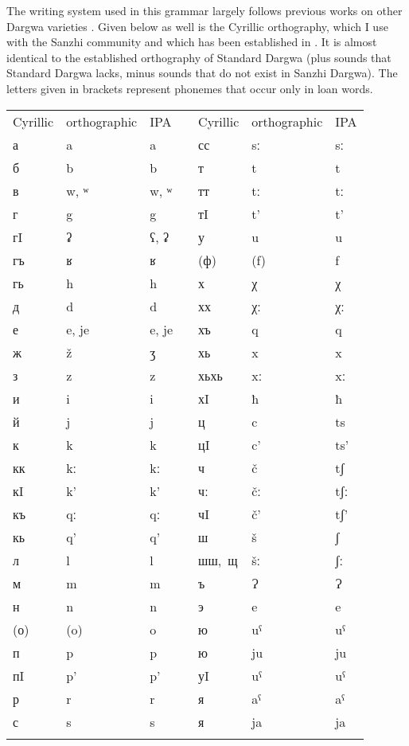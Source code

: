 \label{Orthographic conventions}

The writing system used in this grammar largely follows previous works on other Dargwa varieties \citep{Sumbatova.Mutalov2003, Sumbatova.Lander2014}. Given below as well is the Cyrillic orthography, which I use with the Sanzhi community and which has been established in \citet{Forker.Gadzhimuradov2017}. It is almost identical to the established orthography of Standard Dargwa (plus sounds that Standard Dargwa lacks, minus sounds that do not exist in Sanzhi Dargwa). The letters given in brackets represent phonemes that occur only in loan words.
%
\largerpage[2]
\begin{table}[h!]
	\centering
	\small
	\begin{tabularx}{0.8\textwidth}[]{lllXlll}
	\lsptoprule
			Cyrillic &	orthographic &	IPA	&	{}	&	Cyrillic &	orthographic &	IPA\\
		\cmidrule{1-3} \cmidrule{5-7}
			а	&	a	&	a	&	{}	&	сс	&	sː	&	sː\\
			б	&	b	&	b	&	{}	&	т	&	t	&	t\\
			в	&	w, ʷ	&	w, ʷ	&	{}	&	тт	&	tː	&	tː\\
			г	&	g 	&	g	&	{}	&	тI	&	t’	&	t’\\
			гI	&	ʡ	&	ʕ, ʡ	&	{}	&	у	&	u	&	u\\
			гъ	&	ʁ	&	ʁ	&	{}	&	(ф)	&	(f)	&	f\\
			гь	&	h	&	h	&	{}	&	х	&	χ	&	χ\\
			д	&	d	&	d	&	{}	&	хх	&	χː	&	χː\\
			е	&	e, je	&	e, je	&	{}	&	хъ	&	q	&	q\\	
			ж	&	ž	&	ʒ	&	{}	&	хь	&	x	&	x\\   
			з	&	z	&	z	&	{}	&	хьхь	&	xː	&	xː\\
			и	&	i	&	i	&	{}	&	хI	&	ħ	&	ħ\\
			й	&	j	&	j	&	{}	&	ц	&	c	&	ts\\
			к	&	k	&	k	&	{}	&	цI	&	c’	&	ts’\\
			кк	&	kː	&	kː	&	{}	&	ч	&	č	&	tʃ\\
			кI	&	k’	&	k’	&	{}	&	чː	&	čː	&	tʃː\\
			къ	&	qː	&	qː	&	{}	&	чI	&	č’	&	tʃ’\\
			кь	&	q’	&	q’	&	{}	&	ш	&	š	&	ʃ\\
			л	&	l	&	l	&	{}	&	\mbox{шш, щ}& šː	&	ʃː\\
			м	&	m	&	m	&	{}	&	ъ	&	Ɂ	&	Ɂ\\
			н	&	n	&	n	&	{}	&	э	&	e	&	e\\
			(о)	&	(o)	&	o	&	{}	&	ю	&	uˁ	&	uˁ\\
			п	&	p	&	p	&	{}	&	ю	&	ju	&	ju\\
			пI	&	p’	&	p’	&	{}	&	уI	&	uˁ	&	uˁ\\
			р	&	r	&	r	&	{}	&	я	&	aˁ	&	aˁ\\
			с	&	s	&	s	&	{}	&	я	&	ja	&	ja\\
			\lspbottomrule
	\end{tabularx}
\end{table}


